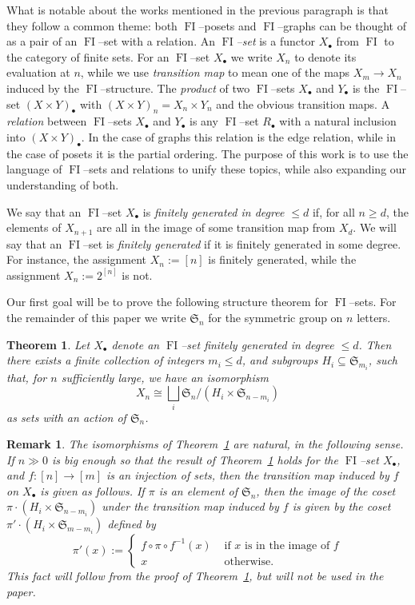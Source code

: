 \documentclass[10pt]{amsart}
\DeclareMathOperator{\FI}{FI}
\newcommand{\Sn}{\mathfrak{S}}
\newcommand{\dt}{\bullet}
\newtheorem{thmab}[theorem]{Theorem}
\newtheorem{remark}[theorem]{Remark}
\theoremstyle{definition}
\begin{document}
What is notable about the works mentioned in the previous paragraph is that they follow a common theme: both $\FI$--posets and $\FI$--graphs can be thought of as a pair of an $\FI$--set with a relation. An \emph{$\FI$--set} is a functor $X_\dt$ from $\FI$ to the category of finite sets. For an $\FI$--set $X_\dt$ we write $X_n$ to denote its evaluation at $n$, while we use \emph{transition map} to mean one of the maps $X_m \to X_n$ induced by the $\FI$--structure. The \emph{product} of two $\FI$--sets $X_{\dt}$ and $Y_{\dt}$ is the $\FI$--set $(X \times Y)_{\dt}$ with $(X \times Y)_n = X_n \times Y_n$ and the obvious transition maps. 
A \emph{relation} between $\FI$--sets $X_\dt$ and $Y_\dt$ is any $\FI$--set $R_{\dt}$ with a natural inclusion into $(X \times Y)_{\dt}$. In the case of graphs this relation is the edge relation, while in the case of posets it is the partial ordering. The purpose of this work is to use the language of $\FI$--sets and relations to unify these topics, while also expanding our understanding of both.

We say that an $\FI$--set $X_\dt$ is \emph{finitely generated in degree $\leq d$} if, for all $n \geq d$, the elements of $X_{n+1}$ are all in the image of some transition map from $X_d$. We will say that an $\FI$--set is \emph{finitely generated} if it is finitely generated in some degree. For instance, the assignment $X_n := [n]$ is finitely generated, while the assignment $X_n := 2^{[n]}$ is not.

Our first goal will be to prove the following structure theorem for $\FI$--sets. For the remainder of this paper we write $\Sn_n$ for the symmetric group on $n$ letters.

\begin{thmab}\label{structurethm}
Let $X_\dt$ denote an $\FI$--set finitely generated in degree $\leq d$. Then there exists a finite collection of integers $m_i \leq d$, and subgroups $H_i \subseteq \Sn_{m_i}$, such that, for $n$ sufficiently large, we have an isomorphism 
\[
X_n \cong \bigsqcup_i \Sn_n / (H_i \times \Sn_{n-m_i})
\]
as sets with an action of $\Sn_n$.
\end{thmab}

\begin{remark}
The isomorphisms of Theorem~\ref{structurethm} are natural, in the following sense. If $n \gg 0$ is big enough so that the result of Theorem~\ref{structurethm} holds for the $\FI$--set $X_\dt$, and $f:[n] \rightarrow [m]$ is an injection of sets, then the transition map induced by $f$ on $X_\dt$ is given as follows. If $\pi$ is an element of $\Sn_n$, then the image of the coset $\pi \cdot (H_i \times \Sn_{n-m_i})$ under the transition map induced by $f$ is given by the coset $\pi' \cdot(H_i \times \Sn_{m-m_i})$ defined by
\[
\pi'(x) := \begin{cases} f \circ \pi \circ f^{-1}(x) & \text{ if $x$ is in the image of $f$}\\ x & \text{ otherwise.}\end{cases}
\]
This fact will follow from the proof of Theorem~\ref{structurethm}, but will not be used in the paper.
\end{remark}
\end{document}
